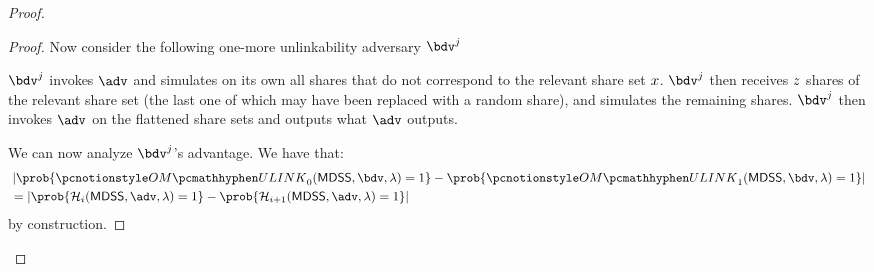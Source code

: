 \begin{proof}
\begin{proof}
		Now consider the following one-more unlinkability adversary $\bdv^j$
		\begin{pcvstack}[center, space=1em]

		\end{pcvstack}
		$\bdv^j$ invokes $\adv$ and simulates on its own all shares that do not correspond to the relevant share set $x$.
		$\bdv^j$ then receives $z$ shares of the relevant share set (the last one of which may have been replaced with a random share), and simulates the remaining shares.
		$\bdv^j$ then invokes $\adv$ on the flattened share sets and outputs what $\adv$ outputs.

		We can now analyze $\bdv^j$'s advantage. We have that:
		\begin{align*}
			 & \left| \prob{\omulink_0(\mdss, \bdv, \secpar) = 1} - \prob{\omulink_1(\mdss, \bdv, \secpar)= 1} \right|     \\
			 & = \left| \prob{\hyb_i(\mdss, {\adv}, \secpar) =1} - \prob{\hyb_{i + 1}(\mdss, {\adv}, \secpar) = 1} \right|
		\end{align*}
		by construction.


\end{proof}
\end{proof}
